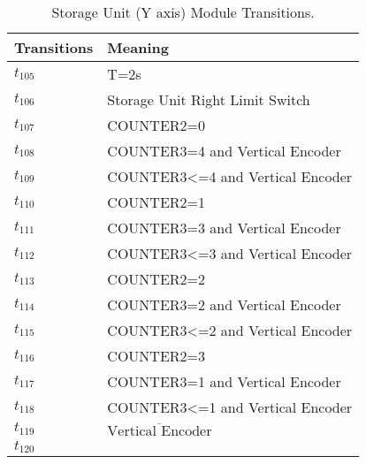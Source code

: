 \begin{table}[H]
\caption{Storage Unit (Y axis) Module Transitions.}
\centering
\begin{tabular}{M{5cm}M{10cm}}
Transitions & Meaning\\
\hline
\hyperlink{partialNet:tt105}{\hypertarget{partialTable:tt105}{$t_{105}$}} & T=2s\\
\hyperlink{partialNet:t106}{\hypertarget{partialTable:t106}{$t_{106}$}} & Storage Unit Right Limit Switch\\
\hyperlink{partialNet:t107}{\hypertarget{partialTable:t107}{$t_{107}$}} & COUNTER2=0\\
\hyperlink{partialNet:t108}{\hypertarget{partialTable:t108}{$t_{108}$}} & COUNTER3=4 and Vertical Encoder\\
\hyperlink{partialNet:t109}{\hypertarget{partialTable:t109}{$t_{109}$}} & COUNTER3<=4 and Vertical Encoder\\
\hyperlink{partialNet:t110}{\hypertarget{partialTable:t110}{$t_{110}$}} & COUNTER2=1\\
\hyperlink{partialNet:t111}{\hypertarget{partialTable:t111}{$t_{111}$}} & COUNTER3=3 and Vertical Encoder\\
\hyperlink{partialNet:t112}{\hypertarget{partialTable:t112}{$t_{112}$}} & COUNTER3<=3 and Vertical Encoder\\
\hyperlink{partialNet:t113}{\hypertarget{partialTable:t113}{$t_{113}$}} & COUNTER2=2\\
\hyperlink{partialNet:t114}{\hypertarget{partialTable:t114}{$t_{114}$}} & COUNTER3=2 and Vertical Encoder\\
\hyperlink{partialNet:t115}{\hypertarget{partialTable:t115}{$t_{115}$}} & COUNTER3<=2 and Vertical Encoder\\
\hyperlink{partialNet:t116}{\hypertarget{partialTable:t116}{$t_{116}$}} & COUNTER2=3\\
\hyperlink{partialNet:t117}{\hypertarget{partialTable:t117}{$t_{117}$}} & COUNTER3=1 and Vertical Encoder\\
\hyperlink{partialNet:t118}{\hypertarget{partialTable:t118}{$t_{118}$}} & COUNTER3<=1 and Vertical Encoder\\
\hyperlink{partialNet:t119}{\hypertarget{partialTable:t119}{$t_{119}$}} & \(\overline{\mbox{Vertical Encoder}}\)\\
\hyperlink{partialNet:t120}{\hypertarget{partialTable:t120}{$t_{120}$}} & \\
\end{tabular}
\end{table}
